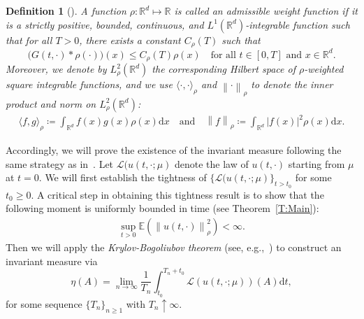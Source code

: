 \documentclass[sn-mathphys]{sn-jnl}%
\newcommand{\BR}{\mathbb{R}}
\newcommand{\E}{\mathbb{E}}
\newcommand{\Norm}[1]{\left\| #1 \right\|}
\newcommand{\ud}{\ensuremath{\mathrm{d}}}
\numberwithin{equation}{section}
\theoremstyle{thmstyleone}%
\theoremstyle{thmstyletwo}%
\theoremstyle{thmstylethree}%
\newtheorem{definition}{Definition}[section]%
\begin{document}
\begin{definition}[\cite{tessitore.zabczyk:98:invariant}]\label{D:Rho}
  A function $\rho:\BR^d\mapsto \BR$ is called an {\normalfont admissible weight function} if it is a
  strictly positive, bounded, continuous, and $L^1 (\BR^d)$-integrable function such that for all
  $T>0$, there exists a constant $C_\rho(T)$ such that
  \begin{equation}\label{E:aw}
    \big(G(t,\cdot)*\rho(\cdot)\big)(x) \le C_\rho(T) \rho(x)
    \quad \text{for all $t\in[0,T]$ and $x\in\BR^d$.}
  \end{equation}
  Moreover, we denote by $L^2_{\rho}(\BR^d)$ the corresponding Hilbert space of $\rho$-weighted
  square integrable functions, and we use $\langle \cdot, \cdot \rangle_{\rho}$ and
  $\Norm{\cdot}_{\rho}$ to denote the inner product and norm on $L^2_{\rho}(\BR^d)$:
  \begin{align*}
  		\langle f,g \rangle_{\rho} \coloneqq \int_{\BR^d} f(x) g(x) \rho(x) \ud x \quad \text{and} \quad
      \Norm{f}_{\rho} \coloneqq \int_{\BR^d} \lvert f(x)\rvert^2 \rho(x) \ud x.
  \end{align*}
\end{definition}

Accordingly, we will prove the existence of the invariant measure following the same strategy as
in~\cite{tessitore.zabczyk:98:invariant}. Let $\mathscr{L}(u(t,\cdot;\mu)$ denote the law of
$u(t,\cdot)$ starting from $\mu$ at $t = 0$. We will first establish the tightness of
$\{\mathscr{L}(u(t,\cdot;\mu)\}_{t>t_0}$ for some $ t_0\ge 0$. A critical step in obtaining this
tightness result is to show that the following moment is uniformly bounded in time (see
Theorem~\ref{T:Main}):
\begin{align}\label{E:BddMnt}
  \sup_{t>0} \E\left(\Norm{u(t,\cdot)}_{\rho}^2\right) <\infty.
\end{align}
Then we will apply the \textit{Krylov-Bogoliubov theorem} (see,
e.g.,~\cite[Theorem~11.7]{da-prato.zabczyk:14:stochastic}) to construct an invariant measure via
\begin{equation}\label{E:InvMeasForm}
  \eta(A) = \lim_{n \to \infty} \frac{1}{T_n} \int_{t_0}^{T_n + t_0} \mathscr{L}(u(t,\cdot; \mu))(A) \ud t,
\end{equation}
for some sequence $\{T_n\}_{n\ge 1}$ with $T_n\uparrow \infty$. \medskip
\end{document}

